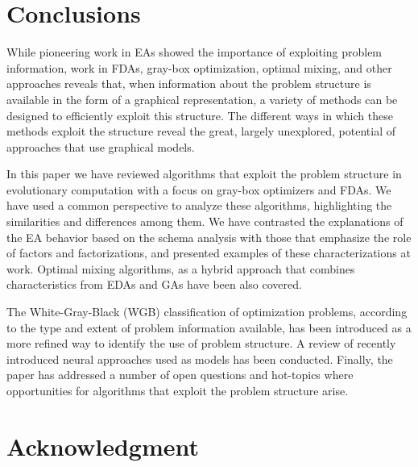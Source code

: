 \documentclass{article} %
\begin{document}
\section{Conclusions} \label{sec:CONCLU}


 While pioneering work in EAs showed the importance of exploiting problem information, work in FDAs, gray-box optimization, optimal mixing, and other approaches reveals that, when information about the problem structure is available in the form of a graphical representation, a variety of methods can be designed to efficiently exploit this structure. The different ways in which these methods exploit the structure reveal the great, largely unexplored, potential of approaches that use graphical models.

 In this paper we have reviewed algorithms that exploit the problem structure in evolutionary computation with a focus on gray-box optimizers and FDAs.  We have used  a common perspective to analyze these algorithms, highlighting the similarities and differences among them.  We have contrasted the explanations of the EA behavior based on the schema analysis with those that emphasize the role of factors and factorizations, and presented examples of these characterizations at work. Optimal mixing algorithms, as a hybrid approach that combines characteristics from EDAs and GAs have been also covered. 

 The White-Gray-Black (WGB) classification of optimization problems, according to the type and extent of problem information available, has been introduced as a more refined way to identify the use of problem structure. A review of recently introduced neural approaches used as models has been conducted. Finally, the paper has addressed a number of open questions and hot-topics where opportunities for algorithms that exploit the problem structure arise. 
 
 


\section*{Acknowledgment}






\
\end{document}
